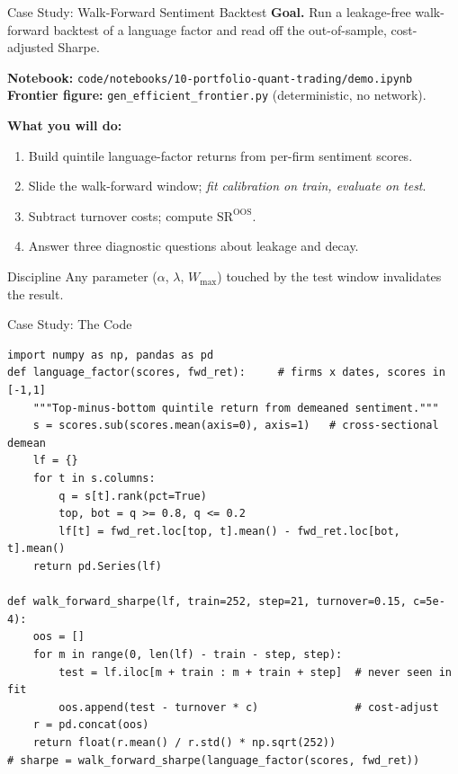 \documentclass[9pt,t]{beamer}
\begin{document}
\begin{frame}{Case Study: Walk-Forward Sentiment Backtest}
\textbf{Goal.} Run a leakage-free walk-forward backtest of a language factor and
read off the out-of-sample, cost-adjusted Sharpe.

\medskip
\textbf{Notebook:} \texttt{code/notebooks/10-portfolio-quant-trading/demo.ipynb}\\
\textbf{Frontier figure:} \texttt{gen\_efficient\_frontier.py} (deterministic, no network).

\medskip
\textbf{What you will do:}
\begin{enumerate}
  \item Build quintile language-factor returns from per-firm sentiment scores.
  \item Slide the walk-forward window; \emph{fit calibration on train, evaluate on test}.
  \item Subtract turnover costs; compute $\text{SR}^{\text{OOS}}$.
  \item Answer three diagnostic questions about leakage and decay.
\end{enumerate}

\medskip
\begin{alertblock}{Discipline}
Any parameter ($\alpha$, $\lambda$, $W_{\max}$) touched by the test window invalidates the result.
\end{alertblock}
\end{frame}

\begin{frame}[fragile]{Case Study: The Code}
\begin{lstlisting}[basicstyle=\ttfamily\scriptsize]
import numpy as np, pandas as pd
def language_factor(scores, fwd_ret):     # firms x dates, scores in [-1,1]
    """Top-minus-bottom quintile return from demeaned sentiment."""
    s = scores.sub(scores.mean(axis=0), axis=1)   # cross-sectional demean
    lf = {}
    for t in s.columns:
        q = s[t].rank(pct=True)
        top, bot = q >= 0.8, q <= 0.2
        lf[t] = fwd_ret.loc[top, t].mean() - fwd_ret.loc[bot, t].mean()
    return pd.Series(lf)

def walk_forward_sharpe(lf, train=252, step=21, turnover=0.15, c=5e-4):
    oos = []
    for m in range(0, len(lf) - train - step, step):
        test = lf.iloc[m + train : m + train + step]  # never seen in fit
        oos.append(test - turnover * c)               # cost-adjust
    r = pd.concat(oos)
    return float(r.mean() / r.std() * np.sqrt(252))
# sharpe = walk_forward_sharpe(language_factor(scores, fwd_ret))
\end{lstlisting}
\end{frame}
\end{document}
